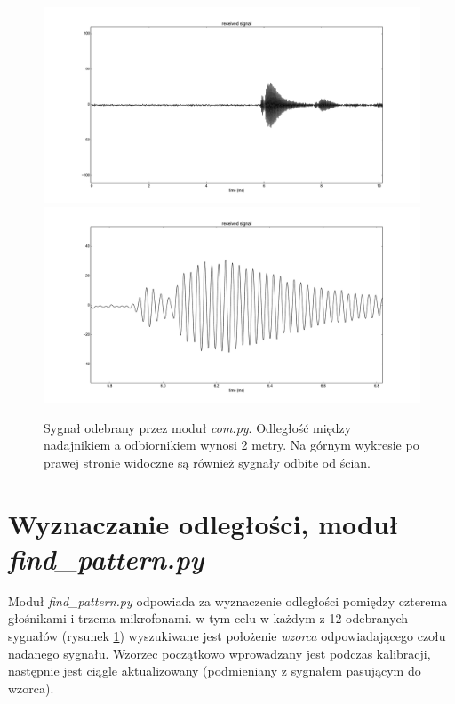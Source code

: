 \begin{figure}[h!]
    \centering
    \includegraphics[width=1.15\textwidth, trim= 47mm 0mm 0mm 0mm,clip]{com_output_2m_1}
    \includegraphics[width=1.15\textwidth, trim= 47mm 0mm 0mm 0mm,clip]{com_output_2m_2}
    \caption{Sygnał odebrany przez moduł \textit{com.py}. 
    Odległość między nadajnikiem a odbiornikiem wynosi 2 metry.
    Na górnym wykresie po prawej stronie widoczne są również sygnały odbite od ścian.
    }
    \label{fig:com_output_2m}
\end{figure}


\section{Wyznaczanie odległości, moduł \textit{find\_pattern.py}}

Moduł \textit{find\_pattern.py} odpowiada za wyznaczenie odległości pomiędzy czterema głośnikami i trzema mikrofonami.
w tym celu w każdym z 12 odebranych sygnałów (rysunek \ref{fig:com_output_2m}) wyszukiwane jest
położenie \textit{wzorca} odpowiadającego czołu nadanego sygnału.
Wzorzec początkowo wprowadzany jest podczas kalibracji, następnie jest ciągle aktualizowany 
(podmieniany z sygnałem pasującym do wzorca).

